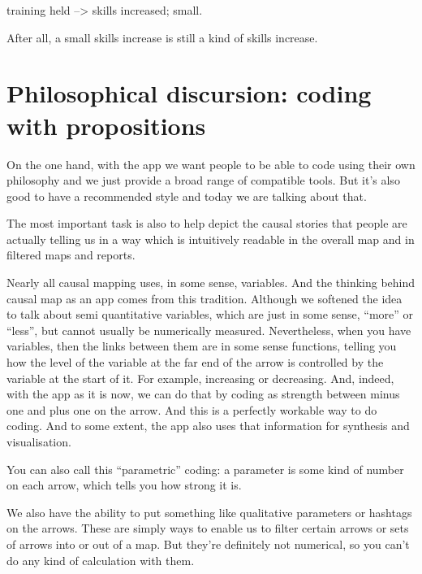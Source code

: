 \documentclass[
]{book}
\begin{document}
training held --\textgreater{} skills increased; small.

After all, a small skills increase is still a kind of skills increase.

\hypertarget{philosophical-discursion-coding-with-propositions}{%
\section{Philosophical discursion: coding with propositions}\label{philosophical-discursion-coding-with-propositions}}

On the one hand, with the app we want people to be able to code using their own philosophy and we just provide a broad range of compatible tools. But it's also good to have a recommended style and today we are talking about that.

The most important task is also to help depict the causal stories that people are actually telling us in a way which is intuitively readable in the overall map and in filtered maps and reports.

Nearly all causal mapping uses, in some sense, variables. And the thinking behind causal map as an app comes from this tradition. Although we softened the idea to talk about semi quantitative variables, which are just in some sense, ``more'' or ``less'', but cannot usually be numerically measured. Nevertheless, when you have variables, then the links between them are in some sense functions, telling you how the level of the variable at the far end of the arrow is controlled by the variable at the start of it. For example, increasing or decreasing. And, indeed, with the app as it is now, we can do that by coding as strength between minus one and plus one on the arrow. And this is a perfectly workable way to do coding. And to some extent, the app also uses that information for synthesis and visualisation.

You can also call this ``parametric'' coding: a parameter is some kind of number on each arrow, which tells you how strong it is.

We also have the ability to put something like qualitative parameters or hashtags on the arrows. These are simply ways to enable us to filter certain arrows or sets of arrows into or out of a map. But they're definitely not numerical, so you can't do any kind of calculation with them.
\end{document}
